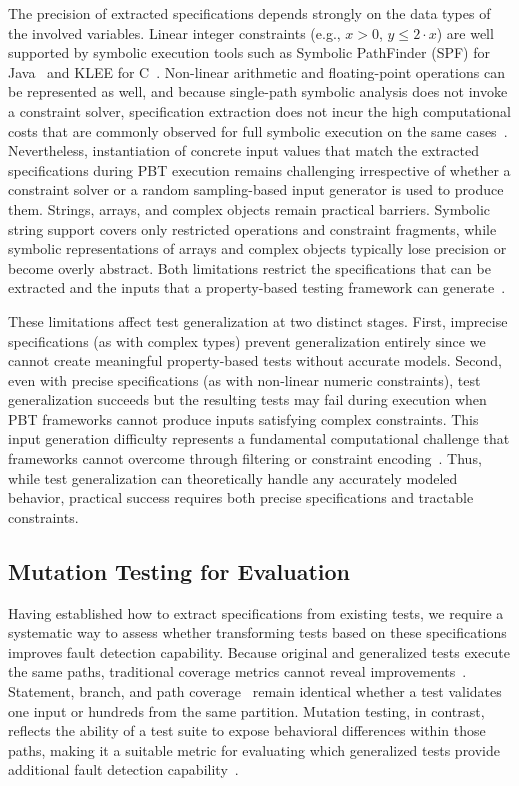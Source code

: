 The precision of extracted specifications depends strongly
on the data types of the involved variables.
Linear integer constraints (e.g., $x > 0$, $y \leq 2 \cdot x$)
are well supported by symbolic execution tools such as
Symbolic PathFinder (SPF) for Java~\cite{pasareanu_2013_symbolic}
and KLEE for C~\cite{cadar_2008_klee}.
Non-linear arithmetic and floating-point operations
can be represented as well,
and because single-path symbolic analysis does not invoke a constraint solver,
specification extraction does not incur the high computational costs
that are commonly observed for full symbolic execution
on the same cases~\cite{de_moura_2008_z3,baldoni_2018_survey}.
Nevertheless, instantiation of concrete input values
that match the extracted specifications during PBT execution
remains challenging irrespective of whether a constraint
solver or a random sampling-based input generator is used to produce them.
Strings, arrays, and complex objects remain practical barriers.
Symbolic string support covers only restricted operations and constraint fragments,
while symbolic representations of arrays and complex objects typically lose precision
or become overly abstract.
Both limitations restrict the specifications that can be extracted
and the inputs that a property-based testing framework can generate~\cite{baldoni_2018_survey,amadini_2021_string_survey}.

These limitations affect test generalization at two distinct stages.
First, imprecise specifications (as with complex types) prevent generalization entirely
since we cannot create meaningful property-based tests without accurate models.
Second, even with precise specifications (as with non-linear numeric constraints),
test generalization succeeds but the resulting tests may fail during execution
when PBT frameworks cannot produce inputs satisfying complex constraints.
This input generation difficulty represents a fundamental computational challenge
that frameworks cannot overcome through filtering or constraint encoding~\cite{claessen_2000_quickcheck,link_2022_jqwik}.
Thus, while test generalization can theoretically handle any accurately modeled behavior,
practical success requires both precise specifications and tractable constraints.

\subsection{Mutation Testing for Evaluation}
\label{sec:mutation-testing}

Having established how to extract specifications from existing tests,
we require a systematic way to assess whether transforming tests based on these specifications
improves fault detection capability.
Because original and generalized tests execute the same paths, traditional
coverage metrics cannot reveal improvements~\cite{inozemtseva_2014_coverage}.
Statement, branch, and path coverage~\cite{zhu_1997_software}
remain identical whether a test validates one input or hundreds from the same partition.
Mutation testing, in contrast, reflects the ability of a test suite to expose
behavioral differences within those paths, making it a suitable metric for evaluating
which generalized tests provide additional fault detection capability~\cite{jia_2011_analysis}.

